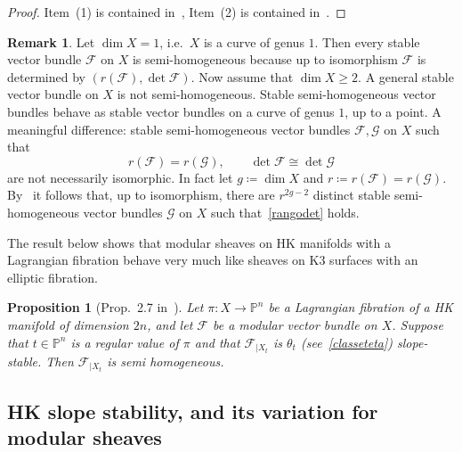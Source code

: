 \documentclass[11pt]{amsart}
\newcommand{\PP}{{\mathbb P}}
\let\mathcal\mathscr
\def\cF{\mathcal{F}}
\def\cG{\mathcal{G}}
\newtheorem{prp}[lmm]{Proposition}
\theoremstyle{definition}
\newtheorem{rmk}[lmm]{Remark}
\theoremstyle{remark}
\begin{document}
%
%
\begin{proof}
%
Item~(1) is contained in~\cite[Thm.~5.8]{muksemi}, Item~(2) is contained in~\cite[Prop.~6.17]{muksemi}.
%
\end{proof}
%
%
\begin{rmk}\label{rmk:semihomedell}
%
Let $\dim X=1$, i.e.~$X$ is a curve of genus $1$. Then every stable vector bundle $\cF$ on $X$ is semi-homogeneous because up to isomorphism  $\cF$ is determined by $(r(\cF),\det \cF)$. Now assume that $\dim X\ge 2$. A general stable vector bundle  on $X$ is not 
semi-homogeneous. Stable semi-homogeneous vector bundles behave  as stable vector bundles on a curve of genus $1$, up to a point. A meaningful difference:  stable semi-homogeneous  vector bundles $\cF,\cG$ on $X$ such that 
%
\begin{equation}\label{rangodet}
%
r(\cF)=r(\cG),\qquad \det\cF\cong\det \cG
%
\end{equation}
%
 are not necessarily isomorphic.  In fact let $g\coloneqq\dim X$ and $r\coloneqq r(\cF)=r(\cG)$. By~\cite[Prop.~7.1]{muksemi} it follows  that, up to isomorphism,   there are  $r^{2g-2}$ distinct stable semi-homogeneous  vector bundles $\cG$ on $X$ such that~\eqref{rangodet} holds.
%
\end{rmk}
%
The result below shows that modular sheaves on HK manifolds with a  Lagrangian fibration behave very much like sheaves on K3 surfaces with an elliptic fibration. 
%
\begin{prp}[Prop.~2.7 in~\cite{og:fascimod}]\label{prp:ressemi}
%
Let  $\pi\colon X\to\PP^n$ be a   Lagrangian fibration of a HK manifold of dimension $2n$, and let $\cF$ be a modular vector bundle on $X$. Suppose that $t\in\PP^n$ is a regular value of $\pi$ and that $\cF_{|X_t}$ is $\theta_t$ (see~\eqref{classeteta}) slope-stable. Then 
$\cF_{|X_t}$  is  semi homogeneous.
%
\end{prp}
%




%
\subsection{HK slope stability, and its variation  for modular  sheaves}
%
%
\setcounter{equation}{0}
%

%
\end{document}
